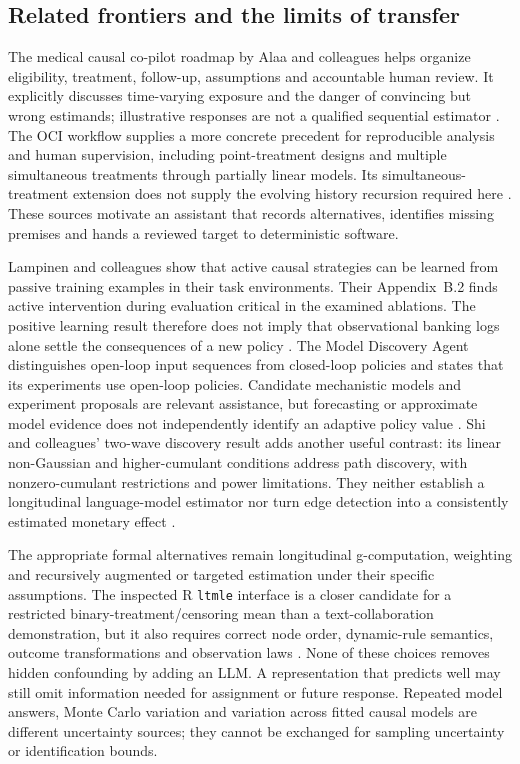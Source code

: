 \subsection{Related frontiers and the limits of transfer}

The medical causal co-pilot roadmap by Alaa and colleagues helps organize
eligibility, treatment, follow-up, assumptions and accountable human
review. It explicitly discusses time-varying exposure and the danger of
convincing but wrong estimands; illustrative responses are not a
qualified sequential estimator
\citep{v12_la_2407_19118}.
The OCI workflow supplies a more concrete precedent for reproducible
analysis and human supervision, including point-treatment designs and
multiple simultaneous treatments through partially linear models.
Its simultaneous-treatment extension does not supply the evolving
history recursion required here
\citep{v12_la_2607_22443}.
These sources motivate an assistant that records alternatives, identifies
missing premises and hands a reviewed target to deterministic software.

Lampinen and colleagues show that active causal strategies can be
learned from passive training examples in their task environments.
Their Appendix~B.2 finds active intervention during evaluation critical
in the examined ablations. The positive learning result therefore does
not imply that observational banking logs alone settle the consequences
of a new policy
\citep{v12_la_2305_16183}.
The Model Discovery Agent distinguishes open-loop input sequences from
closed-loop policies and states that its experiments use open-loop
policies. Candidate mechanistic models and experiment proposals are
relevant assistance, but forecasting or approximate model evidence does
not independently identify an adaptive policy value
\citep{v12_la_2608_09696}.
Shi and colleagues' two-wave discovery result adds another useful
contrast: its linear non-Gaussian and higher-cumulant conditions address
path discovery, with nonzero-cumulant restrictions and power limitations.
They neither establish a longitudinal language-model estimator nor turn
edge detection into a consistently estimated monetary effect
\citep{exec15_latent_shi}.

The appropriate formal alternatives remain longitudinal g-computation,
weighting and recursively augmented or targeted estimation under their
specific assumptions. The inspected R \texttt{ltmle} interface is a
closer candidate for a restricted binary-treatment/censoring mean than
a text-collaboration demonstration, but it also requires correct node
order, dynamic-rule semantics, outcome transformations and observation
laws \citep{sw_ltmle}. None of these choices removes hidden confounding
by adding an LLM. A representation that predicts well may still omit
information needed for assignment or future response. Repeated model
answers, Monte Carlo variation and variation across fitted causal
models are different uncertainty sources; they cannot be exchanged for
sampling uncertainty or identification bounds.

